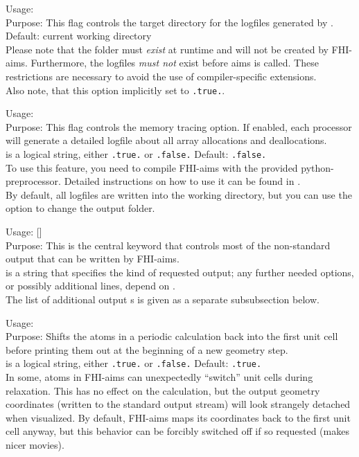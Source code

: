 {
  \noindent
  Usage:   \\[1.0ex]
  Purpose: This flag controls the target directory for the logfiles generated by
  . Default: current working directory\\[1.0ex]
}
Please note that the folder must \emph{exist} at runtime and will not be created by
FHI-aims. Furthermore, the logfiles \emph{must not} exist before aims is called. These
restrictions are necessary to avoid the use of compiler-specific extensions.\\
Also note, that this option implicitly set  to \texttt{.true.}.

{
  \noindent
  Usage:   \\[1.0ex]
  Purpose: This flag controls the memory tracing option. If enabled, each processor
  will generate a detailed logfile about all array allocations and deallocations.\\[1.0ex]
   is a logical string, either \texttt{.true.} or
    \texttt{.false.} Default: \texttt{.false.} \\[1.0ex]
}
To use this feature, you need to compile FHI-aims with the provided python-preprocessor.
Detailed instructions on how to use it can be found in .\\
By default, all logfiles are written into the working directory, but you can use the option
 to change the output folder. 


{
  \noindent
  Usage:   []\\[1.0ex]
  Purpose: This is the central keyword that controls most of the
    non-standard output that can be written by FHI-aims. \\[1.0ex]
   is a string that specifies the kind of requested
    output; any further needed options, or possibly additional lines,
    depend on . \\
}
The list of additional output s is given as a separate
subsubsection below. 


{
  \noindent
  Usage:   \\[1.0ex]
  Purpose: Shifts the atoms in a periodic calculation back into the
    first unit cell before printing them out at the beginning of a new
    geometry step. \\[1.0ex]
   is a logical string, either \texttt{.true.} or
    \texttt{.false.} Default: \texttt{.true.} \\
}
In some, atoms in FHI-aims can unexpectedly ``switch'' unit cells
during relaxation. This has no effect on the calculation, but the
output geometry coordinates (written to the standard output stream)
will look strangely detached when visualized. By default, FHI-aims
maps its coordinates back to the first unit cell anyway, but this
behavior can be forcibly switched off if so requested (makes nicer
movies).  


